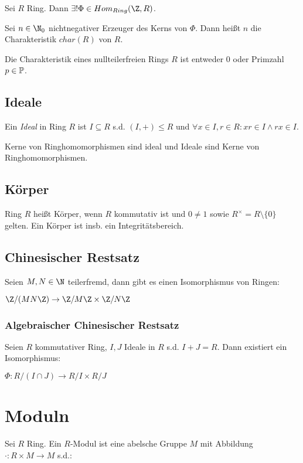 Sei $R$ Ring. Dann $\exists! \Phi \in Hom_{Ring}(\Z,R)$.

Sei $n \in \N_0$ nichtnegativer Erzeuger des Kerns von $\Phi$. Dann heißt $n$ die Charakteristik $char(R)$ von $R$.

Die Charakteristik eines nullteilerfreien Rings $R$ ist entweder $0$ oder Primzahl $p \in \mathbb{P}$.

\subsection*{Ideale}

Ein \emph{Ideal} in Ring $R$ ist $I \subseteq R$ s.d. $(I,+) \leq R$ und $\forall x \in I, r \in R : xr \in I \land rx \in I$.

Kerne von Ringhomomorphismen sind ideal und Ideale sind Kerne von Ringhomomorphismen.

\subsection*{Körper}

Ring $R$ heißt Körper, wenn $R$ kommutativ ist und $0 \neq 1$ sowie $R^\times = R \setminus \{0\}$ gelten. Ein Körper ist insb. ein Integritätsbereich.

\subsection*{Chinesischer Restsatz}

Seien $M, N \in \N$ teilerfremd, dann gibt es einen Isomorphismus von Ringen:

$\Z/(MN\Z) \to \Z/M\Z \times \Z/N\Z$

\subsubsection*{Algebraischer Chinesischer Restsatz}

Seien $R$ kommutativer Ring, $I, J$ Ideale in $R$ s.d. $I + J = R$. Dann existiert ein Isomorphismus:

$\Phi : R/(I \cap J) \to R/I \times R/J$

\section*{Moduln}

Sei $R$ Ring. Ein $R$-Modul ist eine abelsche Gruppe $M$ mit Abbildung $\cdot : R \times M \to M$ s.d.:

